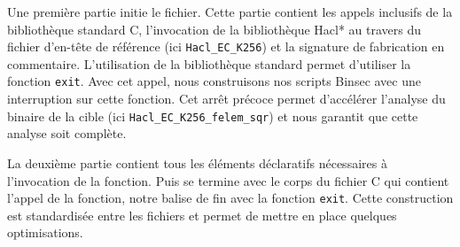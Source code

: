Une première partie initie le fichier. Cette partie contient les appels inclusifs de la bibliothèque standard C, l'invocation de la bibliothèque Hacl* au travers du fichier d'en-tête de référence (ici \texttt{Hacl\_EC\_K256}) et la signature de fabrication en commentaire. L'utilisation de la bibliothèque standard permet d'utiliser la fonction \texttt{exit}. Avec cet appel, nous construisons nos scripts Binsec avec une interruption sur cette fonction. Cet arrêt précoce permet d'accélérer l'analyse du binaire de la cible (ici \texttt{Hacl\_EC\_K256\_felem\_sqr}) et nous garantit que cette analyse soit complète.\smallbreak

La deuxième partie contient tous les éléments déclaratifs nécessaires à l'invocation de la fonction. Puis se termine avec le corps du fichier C qui contient l'appel de la fonction, notre balise de fin avec la fonction \texttt{exit}. Cette construction est standardisée entre les fichiers et permet de mettre en place quelques optimisations.


